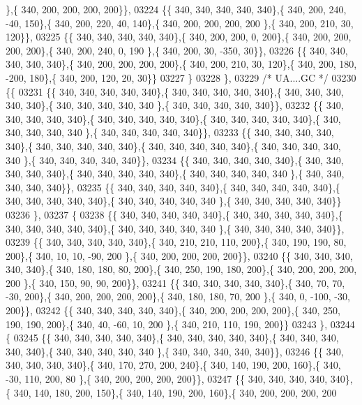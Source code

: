 \begin{DoxyCode}
      \},\{ 340, 200, 200, 200, 200\}\},
03224 \{\{ 340, 340, 340, 340, 340\},\{ 340, 200, 240, -40, 150\},\{ 340, 200, 220,  40, 140\},\{ 340, 200, 200, 200, 200
      \},\{ 340, 200, 210,  30, 120\}\},
03225 \{\{ 340, 340, 340, 340, 340\},\{ 340, 200, 200,   0, 200\},\{ 340, 200, 200, 200, 200\},\{ 340, 200, 240,   0, 190
      \},\{ 340, 200,  30, -350,  30\}\},
03226 \{\{ 340, 340, 340, 340, 340\},\{ 340, 200, 200, 200, 200\},\{ 340, 200, 210,  30, 120\},\{ 340, 200, 180, -200, 
      180\},\{ 340, 200, 120,  20,  30\}\}
03227 \}
03228 \},
03229 \textcolor{comment}{/* UA....GC */}
03230 \{\{
03231 \{\{ 340, 340, 340, 340, 340\},\{ 340, 340, 340, 340, 340\},\{ 340, 340, 340, 340, 340\},\{ 340, 340, 340, 340, 340
      \},\{ 340, 340, 340, 340, 340\}\},
03232 \{\{ 340, 340, 340, 340, 340\},\{ 340, 340, 340, 340, 340\},\{ 340, 340, 340, 340, 340\},\{ 340, 340, 340, 340, 340
      \},\{ 340, 340, 340, 340, 340\}\},
03233 \{\{ 340, 340, 340, 340, 340\},\{ 340, 340, 340, 340, 340\},\{ 340, 340, 340, 340, 340\},\{ 340, 340, 340, 340, 340
      \},\{ 340, 340, 340, 340, 340\}\},
03234 \{\{ 340, 340, 340, 340, 340\},\{ 340, 340, 340, 340, 340\},\{ 340, 340, 340, 340, 340\},\{ 340, 340, 340, 340, 340
      \},\{ 340, 340, 340, 340, 340\}\},
03235 \{\{ 340, 340, 340, 340, 340\},\{ 340, 340, 340, 340, 340\},\{ 340, 340, 340, 340, 340\},\{ 340, 340, 340, 340, 340
      \},\{ 340, 340, 340, 340, 340\}\}
03236 \},
03237 \{
03238 \{\{ 340, 340, 340, 340, 340\},\{ 340, 340, 340, 340, 340\},\{ 340, 340, 340, 340, 340\},\{ 340, 340, 340, 340, 340
      \},\{ 340, 340, 340, 340, 340\}\},
03239 \{\{ 340, 340, 340, 340, 340\},\{ 340, 210, 210, 110, 200\},\{ 340, 190, 190,  80, 200\},\{ 340,  10,  10, -90, 200
      \},\{ 340, 200, 200, 200, 200\}\},
03240 \{\{ 340, 340, 340, 340, 340\},\{ 340, 180, 180,  80, 200\},\{ 340, 250, 190, 180, 200\},\{ 340, 200, 200, 200, 200
      \},\{ 340, 150,  90,  90, 200\}\},
03241 \{\{ 340, 340, 340, 340, 340\},\{ 340,  70,  70, -30, 200\},\{ 340, 200, 200, 200, 200\},\{ 340, 180, 180,  70, 200
      \},\{ 340,   0, -100, -30, 200\}\},
03242 \{\{ 340, 340, 340, 340, 340\},\{ 340, 200, 200, 200, 200\},\{ 340, 250, 190, 190, 200\},\{ 340,  40, -60,  10, 200
      \},\{ 340, 210, 110, 190, 200\}\}
03243 \},
03244 \{
03245 \{\{ 340, 340, 340, 340, 340\},\{ 340, 340, 340, 340, 340\},\{ 340, 340, 340, 340, 340\},\{ 340, 340, 340, 340, 340
      \},\{ 340, 340, 340, 340, 340\}\},
03246 \{\{ 340, 340, 340, 340, 340\},\{ 340, 170, 270, 200, 240\},\{ 340, 140, 190, 200, 160\},\{ 340, -30, 110, 200,  80
      \},\{ 340, 200, 200, 200, 200\}\},
03247 \{\{ 340, 340, 340, 340, 340\},\{ 340, 140, 180, 200, 150\},\{ 340, 140, 190, 200, 160\},\{ 340, 200, 200, 200, 200

\end{DoxyCode}
